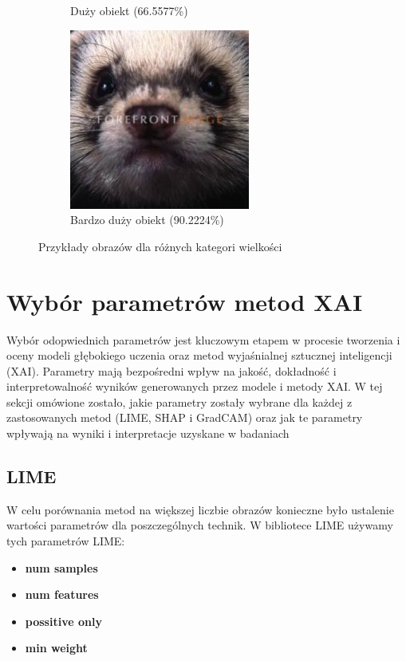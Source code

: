 \begin{figure}[h]
\begin{subfigure}[b]{0.3\textwidth}
		\caption{Duży obiekt (66.5577\%)}  \label{}
	\end{subfigure}
	\begin{subfigure}[b]{0.3\textwidth}
		\centering\includegraphics[width=.9\textwidth]{img/examples/size_category_verybig}
		\caption{Bardzo duży obiekt (90.2224\%)}  \label{}
	\end{subfigure}
	\caption{Przykłady obrazów dla różnych kategori wielkości}
	\label{rys:examples_size_cat}
\end{figure}

\section*{Wybór parametrów metod XAI}
Wybór odopwiednich parametrów jest kluczowym etapem w procesie tworzenia i oceny modeli głębokiego uczenia oraz metod wyjaśnialnej sztucznej inteligencji (XAI).
Parametry mają bezpośredni wpływ na jakość, dokładność i interpretowalność wyników generowanych przez modele i metody XAI.
W tej sekcji omówione zostało, jakie parametry zostały wybrane dla każdej z zastosowanych metod (LIME, SHAP i GradCAM) oraz jak te parametry wpływają na wyniki i interpretacje uzyskane w badaniach

\subsection*{LIME}
W celu porównania metod na większej liczbie obrazów konieczne było ustalenie wartości parametrów dla poszczególnych technik.
W bibliotece LIME używamy tych parametrów LIME:
\begin{itemize}
	\item \textbf{num samples}
	\item \textbf{num features}
	\item \textbf{possitive only}
	\item \textbf{min weight}
\end{itemize}

